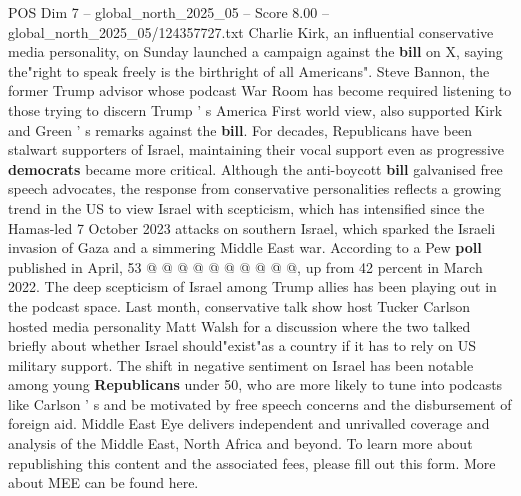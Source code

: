 \begin{textsample}{POS Dim 7 – global\_north\_2025\_05 – Score 8.00 – global\_north\_2025\_05/124357727.txt}
Charlie Kirk, an influential conservative media personality, on Sunday launched a campaign against the \textbf{bill} on X, saying the"right to speak freely is the birthright of all Americans".
Steve Bannon, the former Trump advisor whose podcast War Room has become required listening to those trying to discern Trump ' s America First world view, also supported Kirk and Green ' s remarks against the \textbf{bill}.
For decades, Republicans have been stalwart supporters of Israel, maintaining their vocal support even as progressive \textbf{democrats} became more critical.
Although the anti-boycott \textbf{bill} galvanised free speech advocates, the response from conservative personalities reflects a growing trend in the US to view Israel with scepticism, which has intensified since the Hamas-led 7 October 2023 attacks on southern Israel, which sparked the Israeli invasion of Gaza and a simmering Middle East war.
According to a Pew \textbf{poll} published in April, 53 @ @ @ @ @ @ @ @ @ @, up from 42 percent in March 2022.
The deep scepticism of Israel among Trump allies has been playing out in the podcast space.
Last month, conservative talk show host Tucker Carlson hosted media personality Matt Walsh for a discussion where the two talked briefly about whether Israel should"exist"as a country if it has to rely on US military support.
The shift in negative sentiment on Israel has been notable among young \textbf{Republicans} under 50, who are more likely to tune into podcasts like Carlson ' s and be motivated by free speech concerns and the disbursement of foreign aid.
Middle East Eye delivers independent and unrivalled coverage and analysis of the Middle East, North Africa and beyond.
To learn more about republishing this content and the associated fees, please fill out this form.
More about MEE can be found here.

\end{textsample}
